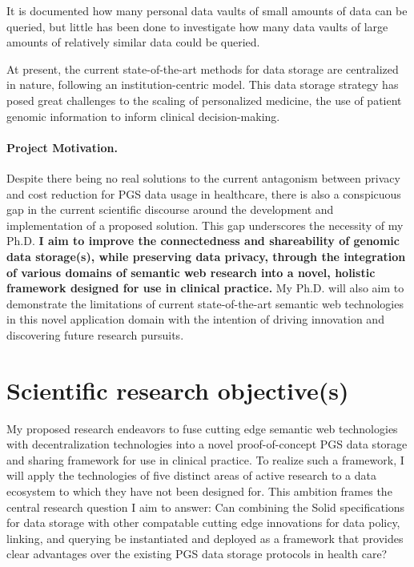 \documentclass[a4paper,11pt]{article}
\begin{document}
\begin{refsection}
It is documented how many personal data vaults of small amounts of data can be queried, but little has been done to investigate how many data vaults of large amounts of relatively similar data could be queried.

At present, the current state-of-the-art methods for data storage are centralized in nature, following an institution-centric model. 
This data storage strategy has posed great challenges to the scaling of personalized medicine, the use of patient genomic information to inform clinical decision-making.


\paragraph{Project Motivation.}
Despite there being no real solutions to the current antagonism between privacy and cost reduction for PGS data usage in healthcare, there is also a conspicuous gap in the current scientific discourse around the development and implementation of a proposed solution. 
This gap underscores the necessity of my Ph.D.
\textbf{I aim to improve the connectedness and shareability of genomic data storage(s), while preserving data privacy, through the integration of various domains of semantic web research into a novel, holistic framework designed for use in clinical practice.}
My Ph.D. will also aim to demonstrate the limitations of current state-of-the-art semantic web technologies in this novel application domain with the intention of driving innovation and discovering future research pursuits.



\section{Scientific research objective(s)}

\begin{comment}
Describe explicitly the scientific objective(s) and the research hypothesis. 
Explain whether and how the research is specifically challenging and inventive, describing in particular the innovative aspects of the envisaged results. 
Discuss in detail the results (or partial results) that you aim to achieve, such as specific knowledge, the solution to particular problems and academic breakthroughs.
\end{comment}
\smallskip

\noindent
My proposed research endeavors to fuse cutting edge semantic web technologies with decentralization technologies into a novel proof-of-concept PGS data storage and sharing framework for use in clinical practice. 
To realize such a framework, I will apply the technologies of five distinct areas of active research to a data ecosystem to which they have not been designed for.
This ambition frames the central research question I aim to answer: Can combining the Solid specifications for data storage with other compatable cutting edge innovations for data policy, linking, and querying be instantiated and deployed as a framework that provides clear advantages over the existing PGS data storage protocols in health care?


\end{refsection}
\end{document}
